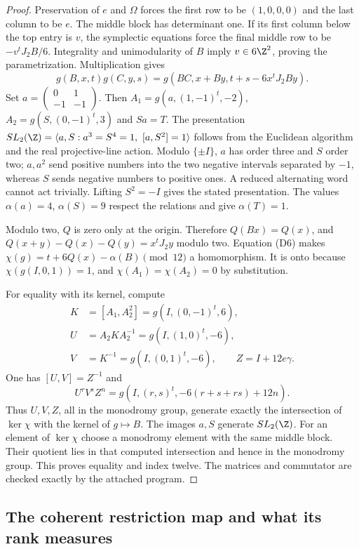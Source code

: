 \begin{proof}
Preservation of $e$ and $\Omega$ forces the first row to be
$(1,0,0,0)$ and the last column to be $e$. The middle block has
determinant one. If its first column below the top entry is $v$,
the symplectic equations force the final middle row to be
$-v^tJ_2B/6$. Integrality and unimodularity of $B$ imply
$v\in6\Z^2$, proving the parametrization. Multiplication gives
\[
g(B,x,t)g(C,y,s)=g(BC,x+By,t+s-6x^tJ_2By).             \tag{D6}
\]
Set $a=\left(\begin{smallmatrix}0&1\\-1&-1\end{smallmatrix}\right)$.
Then $A_1=g(a,(1,-1)^t,-2)$,
$A_2=g(S,(0,-1)^t,3)$ and $Sa=T$.
The presentation
$SL_2(\Z)=\langle a,S:a^3=S^4=1,\ [a,S^2]=1\rangle$
follows from the Euclidean algorithm and the real projective-line
action. Modulo $\{\pm I\}$, $a$ has order three and $S$ order
two; $a,a^2$ send positive numbers into the two negative intervals
separated by $-1$, whereas $S$ sends negative numbers to positive
ones. A reduced alternating word cannot act trivially. Lifting
$S^2=-I$ gives the stated presentation. The values
$\alpha(a)=4$, $\alpha(S)=9$ respect the relations and give
$\alpha(T)=1$.

Modulo two, $Q$ is zero only at the origin. Therefore
$Q(Bx)=Q(x)$, and
$Q(x+y)-Q(x)-Q(y)=x^tJ_2y$ modulo two.
Equation (D6) makes
$\chi(g)=t+6Q(x)-\alpha(B)\pmod{12}$ a homomorphism.
It is onto because $\chi(g(I,0,1))=1$, and
$\chi(A_1)=\chi(A_2)=0$ by substitution.

For equality with its kernel, compute
\[
\begin{aligned}
K&=[A_1,A_2^2]=g(I,(0,-1)^t,6),\\
U&=A_2KA_2^{-1}=g(I,(1,0)^t,-6),\\
V&=K^{-1}=g(I,(0,1)^t,-6),\qquad Z=I+12e\gamma.
\end{aligned}
\]
One has $[U,V]=Z^{-1}$ and
\[
U^rV^sZ^n=g(I,(r,s)^t,-6(r+s+rs)+12n).
\]
Thus $U,V,Z$, all in the monodromy group, generate exactly the
intersection of $\ker\chi$ with the kernel of $g\mapsto B$.
The images $a,S$ generate $SL_2(\Z)$.
For an element of $\ker\chi$ choose a monodromy element with the
same middle block. Their quotient lies in that computed
intersection and hence in the monodromy group. This proves equality
and index twelve. The matrices and commutator are checked exactly
by the attached program.
\end{proof}

\subsection{The coherent restriction map and what its rank measures}

